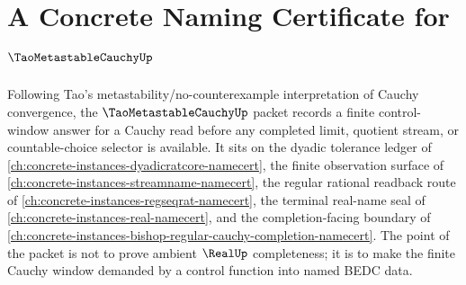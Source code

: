 \chapter{A Concrete Naming Certificate for $\TaoMetastableCauchyUp$}
\label{ch:concrete-instances-tao-metastable-cauchy-namecert}

Following Tao's metastability/no-counterexample interpretation of Cauchy convergence, the $\TaoMetastableCauchyUp$ packet records a finite control-window answer for a Cauchy read before any completed limit, quotient stream, or countable-choice selector is available. It sits on the dyadic tolerance ledger of \autoref{ch:concrete-instances-dyadicratcore-namecert}, the finite observation surface of \autoref{ch:concrete-instances-streamname-namecert}, the regular rational readback route of \autoref{ch:concrete-instances-regseqrat-namecert}, the terminal real-name seal of \autoref{ch:concrete-instances-real-namecert}, and the completion-facing boundary of \autoref{ch:concrete-instances-bishop-regular-cauchy-completion-namecert}. The point of the packet is not to prove ambient $\RealUp$ completeness; it is to make the finite Cauchy window demanded by a control function into named BEDC data.

